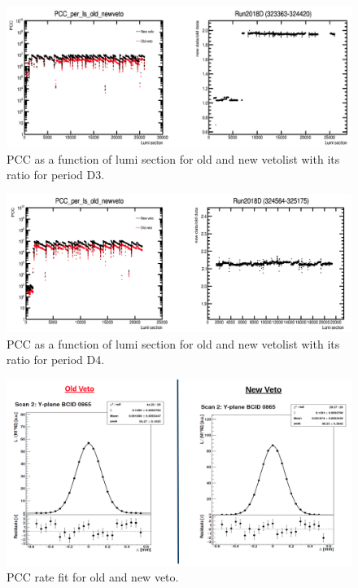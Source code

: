 \begin{figure}[!htp]
\centering
\includegraphics[width=1\textwidth]{ashish_thesis/Run2018D3_old_new_veto.png}
\caption{%
    PCC as a function of lumi section for old and new vetolist with its ratio for period D3.
}
\label{fig:old_new_veto_D3}
\end{figure}

\begin{figure}[!htp]
\centering
\includegraphics[width=1\textwidth]{ashish_thesis/Run2018D4_old_new_veto.png}
\caption{%
    PCC as a function of lumi section for old and new vetolist with its ratio for period D4.
}
\label{fig:old_new_veto_D3}
\end{figure}

\begin{figure}[!htp]
\centering
\includegraphics[width=1\textwidth]{ashish_thesis/vdm_fit_old_new_veto.png}
\caption{%
  PCC rate fit for old and new veto.
}
\label{fig:old_new_veto_vdmfit}
\end{figure}



